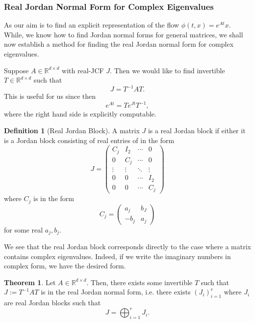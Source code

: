 \documentclass[
]{article}
\theoremstyle{definition}
\newtheorem{theorem}{Theorem}
\theoremstyle{definition}
\newtheorem{definition}{Definition}[section]
\begin{document}
\hypertarget{real-jordan-normal-form-for-complex-eigenvalues}{%
\subsubsection{Real Jordan Normal Form for Complex
Eigenvalues}\label{real-jordan-normal-form-for-complex-eigenvalues}}

As our aim is to find an explicit representation of the flow
\(\phi(t, x) = e^{At}x\). While, we know how to find Jordan normal forms
for general matrices, we shall now establish a method for finding the
real Jordan normal form for complex eigenvalues.

Suppose \(A \in \mathbb{R}^{d \times d}\) with real-JCF \(J\). Then we
would like to find invertible \(T \in \mathbb{R}^{d \times d}\) such
that \[J = T^{-1}A T.\] This is useful for us since then
\[e^{At} = T e^{Jt} T^{-1},\] where the right hand side is explicitly
computable.

\begin{definition}[Real Jordan Block]
  A matrix \(J\) is a real Jordan block if either it is a Jordan block consisting 
  of real entries of in the form 
  \[J = \begin{pmatrix}
    C_j & I_{2} & \cdots & 0\\
    0 & C_j & \cdots & 0\\
    \vdots & \vdots & \ddots & \vdots\\
    0 & 0 & \cdots & I_2\\
    0 & 0 & \cdots & C_j
  \end{pmatrix}\]
  where \(C_j\) is in the form 
  \[C_j = \begin{pmatrix}
    a_j & b_J \\ -b_j & a_j
  \end{pmatrix}\]
  for some real \(a_j, b_j\).
\end{definition}

We see that the real Jordan block corresponds directly to the case where
a matrix contains complex eigenvalues. Indeed, if we write the imaginary
numbers in complex form, we have the desired form.

\begin{theorem}
  Let \(A \in \mathbb{R}^{d \times d}\). Then, there exists some invertible \(T\) 
  such that \(J := T^{-1}AT\) is in the real Jordan normal form, i.e. there exists 
  \((J_i)_{i = 1}^r\) where \(J_i\) are real Jordan blocks such that 
  \[J = \bigoplus_{i = 1}^r J_i.\]
\end{theorem}
\end{document}
